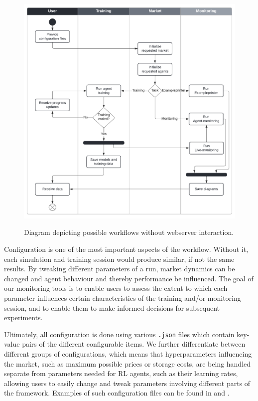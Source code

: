 \begin{figure}[t]
	\centering
	\includegraphics[width = \textwidth]{images/workflow_swimlanes.pdf}\\
	\caption{Diagram depicting possible workflows without webserver interaction.}\label{fig:WorkflowSwimlanes}
\end{figure}

Configuration is one of the most important aspects of the workflow. Without it, each simulation and training session would produce similar, if not the same results. By tweaking different parameters of a run, market dynamics can be changed and agent behaviour and thereby performance be influenced. The goal of our monitoring tools is to enable users to assess the extent to which each parameter influences certain characteristics of the training and/or monitoring session, and to enable them to make informed decisions for subsequent experiments.

Ultimately, all configuration is done using various \texttt{.json} files which contain key-value pairs of the different configurable items. We further differentiate between different groups of configurations, which means that hyperparameters influencing the market, such as maximum possible prices or storage costs, are being handled separate from parameters needed for RL agents, such as their learning rates, allowing users to easily change and tweak parameters involving different parts of the framework. Examples of such configuration files can be found in  and .

